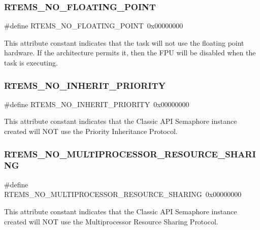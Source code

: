 \subsubsection{\texorpdfstring{RTEMS\_NO\_FLOATING\_POINT}{RTEMS\_NO\_FLOATING\_POINT}}
{\footnotesize\ttfamily \#define R\+T\+E\+M\+S\+\_\+\+N\+O\+\_\+\+F\+L\+O\+A\+T\+I\+N\+G\+\_\+\+P\+O\+I\+NT~0x00000000}

This attribute constant indicates that the task will not use the floating point hardware. If the architecture permits it, then the F\+PU will be disabled when the task is executing. \mbox{\label{group__ClassicAttributes_gab47fe6a8c45288f5c27e5a7ceb7c71ed}} 
\subsubsection{\texorpdfstring{RTEMS\_NO\_INHERIT\_PRIORITY}{RTEMS\_NO\_INHERIT\_PRIORITY}}
{\footnotesize\ttfamily \#define R\+T\+E\+M\+S\+\_\+\+N\+O\+\_\+\+I\+N\+H\+E\+R\+I\+T\+\_\+\+P\+R\+I\+O\+R\+I\+TY~0x00000000}

This attribute constant indicates that the Classic A\+PI Semaphore instance created will N\+OT use the Priority Inheritance Protocol. \mbox{\label{group__ClassicAttributes_gaabcc3aad32e832786b10c782c571617a}} 
\subsubsection{\texorpdfstring{RTEMS\_NO\_MULTIPROCESSOR\_RESOURCE\_SHARING}{RTEMS\_NO\_MULTIPROCESSOR\_RESOURCE\_SHARING}}
{\footnotesize\ttfamily \#define R\+T\+E\+M\+S\+\_\+\+N\+O\+\_\+\+M\+U\+L\+T\+I\+P\+R\+O\+C\+E\+S\+S\+O\+R\+\_\+\+R\+E\+S\+O\+U\+R\+C\+E\+\_\+\+S\+H\+A\+R\+I\+NG~0x00000000}

This attribute constant indicates that the Classic A\+PI Semaphore instance created will N\+OT use the Multiprocessor Resource Sharing Protocol. \mbox{\label{group__ClassicAttributes_gace8723c3fcc4ae0b2c5fbe9ec313d6af}} 
